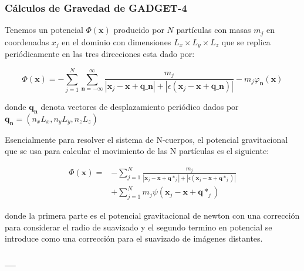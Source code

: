   

\subsubsection{Cálculos de Gravedad de GADGET-4}

Tenemos un potencial $\Phi (\mathbf{x})$ producido por $N$ partículas con masas $m_j$ en coordenadas $x_j$ en el dominio con dimensiones $L_x \times L_y \times L_z$ que se replica periódicamente en las tres direcciones esta dado por:

\begin{equation}
    \Phi (\mathbf{x}) = - \sum_{j=1}^{N} \sum_{\mathbf{n}=-\infty}^{\infty} \frac{m_j}{|\textbf{x}_j-\textbf{x}+\textbf{q_n}| + |\epsilon(\textbf{x}_j-\textbf{x}+\textbf{q_n})|} - m_j\varphi_{\mathbf{n}}(\mathbf{x})
    \label{eq:Grav_Pot_1}
\end{equation}

donde $\mathbf{q_n}$ denota  vectores de desplazamiento periódico dados por $\mathbf{q_n} = (n_x L_x , n_y L_y ,n_z L_z)$


Esencialmente para resolver el sistema de N-cuerpos, el potencial gravitacional que se usa para calcular el movimiento de las N partículas es el siguiente:

\begin{align}
    \Phi (\textbf{x}) = &- \sum_{j=1}^{N} \frac{m_j}{|\textbf{x}_j-\textbf{x}+\textbf{q}*_j| + |\epsilon(\textbf{x}_j-\textbf{x}+\textbf{q}*_j)|} \nonumber \\
    &+ \sum_{j=1}^{N} m_j \psi (\textbf{x}_j-\textbf{x}+\textbf{q}*_j)
\end{align}

donde la primera parte es el potencial gravitacional de newton con una corrección para considerar el radio de suavizado y el segundo termino en potencial se introduce como una corrección para el suavizado de imágenes distantes.


\subsubsection{---}
